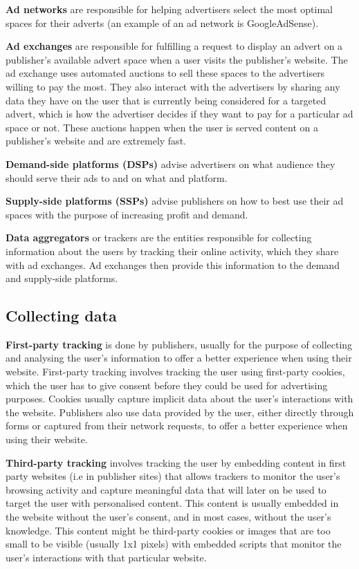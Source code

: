 \documentclass{l4proj}
\begin{document}
\textbf{Ad networks} are responsible for helping advertisers select the most optimal spaces for their adverts (an example of an ad network is GoogleAdSense).

\textbf{Ad exchanges} are responsible for fulfilling a request to display an advert on a publisher's available advert space when a user visits the publisher's website. The ad exchange uses automated auctions to sell these spaces to the advertisers willing to pay the most. They also interact with the advertisers by sharing any data they have on the user that is currently being considered for a targeted advert, which is how the advertiser decides if they want to pay for a particular ad space or not. These auctions happen when the user is served content on a publisher's website and are extremely fast.

\textbf{Demand-side platforms (DSPs)} advise advertisers on what audience they should serve their ads to and on what and platform. 

\textbf{Supply-side platforms (SSPs)} advise publishers on how to best use their ad spaces with the purpose of increasing profit and demand. 

\textbf{Data aggregators} or trackers are the entities responsible for collecting information about the users by tracking their online activity, which they share with ad exchanges. Ad exchanges then provide this information to the demand and supply-side platforms.

\subsection{Collecting data}
\textbf{First-party tracking} is done by publishers, usually for the purpose of collecting and analysing the user's information to offer a better experience when using their website. First-party tracking involves tracking the user using first-party cookies, which the user has to give consent before they could be used for advertising purposes. Cookies usually capture implicit data about the user's interactions with the website. Publishers also use data provided by the user, either directly through forms or captured from their network requests, to offer a better experience when using their website.  

\textbf{Third-party tracking} involves tracking the user by embedding content in first party websites (i.e in publisher sites) that allows trackers to monitor the user's browsing activity and capture meaningful data that will later on be used to target the user with personalised content. This content is usually embedded in the website without the user's consent, and in most cases, without the user's knowledge. This content might be third-party cookies or images that are too small to be visible (usually 1x1 pixels) with embedded scripts that monitor the user's interactions with that particular website.
\end{document}
